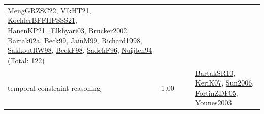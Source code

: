 {\begin{longtable}{p{3cm}r>{\raggedright\arraybackslash}p{6cm}>{\raggedright\arraybackslash}p{6cm}>{\raggedright\arraybackslash}p{8cm}}
\hyperref[detail:MengGRZSC22]{MengGRZSC22}, \hyperref[detail:VlkHT21]{VlkHT21}, \hyperref[detail:KoehlerBFFHPSSS21]{KoehlerBFFHPSSS21}, \hyperref[detail:HanenKP21]{HanenKP21}...\hyperref[detail:Elkhyari03]{Elkhyari03}, \hyperref[detail:Brucker2002]{Brucker2002}, \hyperref[detail:Bartak02a]{Bartak02a}, \hyperref[detail:Beck99]{Beck99}, \hyperref[detail:JainM99]{JainM99}, \hyperref[detail:Richard1998]{Richard1998}, \hyperref[detail:SakkoutRW98]{SakkoutRW98}, \hyperref[detail:BeckF98]{BeckF98}, \hyperref[detail:SadehF96]{SadehF96}, \hyperref[detail:Nuijten94]{Nuijten94} (Total: 122)\\
\index{temporal constraint reasoning}\index{Concepts!temporal constraint reasoning}temporal constraint reasoning &  1.00 &  &  & \hyperref[detail:BartakSR10]{BartakSR10}, \hyperref[detail:KeriK07]{KeriK07}, \hyperref[detail:Sun2006]{Sun2006}, \hyperref[detail:FortinZDF05]{FortinZDF05}, \hyperref[detail:Younes2003]{Younes2003}\\

\end{longtable}}
